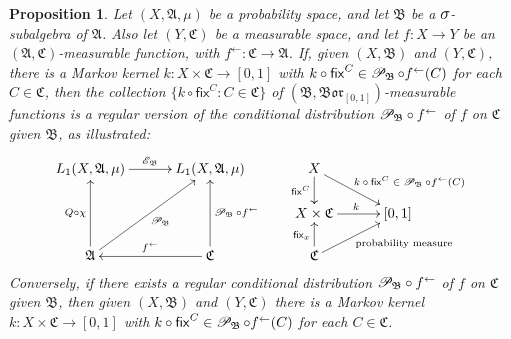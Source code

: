 \documentclass[
twoside=true,
paper=letter,
fontsize=11pt,
pagesize=auto,
leqno,
openany,
headsepline,
overfullrule,
]{scrbook}
\theoremstyle{plain}
\theoremstyle{plain}
\newtheorem{prop}[thm]{Proposition}
\theoremstyle{definition}
\theoremstyle{bfnoteitalic}
\theoremstyle{bfnoteroman}
\newcommand{\sigalg}[1]{\mathfrak{#1}}
\newcommand{\cali}[1]{\mathscr{#1}}
\newcommand{\sfop}[1]{\mathsf{#1}}
\newcommand{\condexpop}[1]{\mathop{\cali{E}\hspace{-1pt}}\nolimits_{#1}}
\newcommand{\condprobop}[1]{\mathop{\cali{P}\hspace{-1pt}}\nolimits_{#1}}
\newcommand{\borel}{\mathfrak{Bor}}
\newcommand{\textsigma}{\hbox{\large{$\sigma$}}\kern-1pt}
\newcommand{\preimage}[1]{#1^{\leftarrow}}
\newcommand{\sigmaalgebra}{\sigalg{A}}
\newcommand{\sigmaalgebraii}{\sigalg{B}}
\newcommand{\sigmaalgebraiii}{\sigalg{C}}
\newcommand{\Lone}{L_1(\measurespace, \sigmaalgebra, \measure)}
\newcommand{\function}{f}
\newcommand{\measurespace}{X}
\newcommand{\measurespaceii}{Y}
\newcommand{\mspaceelt}{x}
\newcommand{\measure}{\mu}
\newcommand{\setiii}{C}
\newcommand{\markovkernel}{k}
\newcommand{\fixinthefirst}[1]{\sfop{fix}_{#1}}
\newcommand{\fixinthesecond}[1]{\sfop{fix}^{#1}}
\begin{document}
\begin{prop}\label{equivalent_definition_regular_distribution}
Let $(\measurespace, \sigmaalgebra, \measure)$ be a probability space, and let $\sigmaalgebraii$ be a $\textsigma$-subalgebra of $\sigmaalgebra$. Also let $(\measurespaceii, \sigmaalgebraiii)$ be a measurable space, and let 
$\function:\measurespace\to\measurespaceii$ be an
$(\sigmaalgebra, \sigmaalgebraiii)$\hyp{}measurable function, with
$\preimage{\function} : \sigmaalgebraiii \to \sigmaalgebra$.
If, given $(\measurespace, \sigmaalgebraii)$ and $(\measurespaceii, \sigmaalgebraiii)$, 
there is a Markov kernel $\markovkernel:\measurespace\times\sigmaalgebraiii\to [0,1]$ with 
$\markovkernel\circ\fixinthesecond{\setiii} \in \condprobop{\sigmaalgebraii}\circ \preimage{\function}(\setiii)$ for each 
$\setiii\in\sigmaalgebraiii$, then the collection 
$\{ 
\markovkernel\circ\fixinthesecond{\setiii} 
: 
\setiii\in\sigmaalgebraiii
\}$
of $(\sigmaalgebraii,\borel_{[0,1]})$\hyp{}measurable functions
is a regular version of the conditional distribution ${\condprobop{\sigmaalgebraii}}\circ \preimage{\function}$ of 
$\function$ on $\sigmaalgebraiii$ given $\sigmaalgebraii$, as illustrated:
\[
\xymatrix@R=16pt@C=30pt{ 
\Lone \ar[r]^{\condexpop{\sigmaalgebraii}}
& \Lone 
& \measurespace 
\ar[d]_-{\fixinthesecond{\setiii}} 
\ar[dr]^{\qquad\text{$\markovkernel\circ\fixinthesecond{\setiii} \in \condprobop{\sigmaalgebraii}\circ \preimage{\function}(\setiii)$}}
\\
& 
& \measurespace\times\sigmaalgebraiii \ar[r]^{\markovkernel} 
& [0,1] 
\\
\sigmaalgebra \ar[uu]^{Q\circ\chi} \ar[uur]_{\condprobop{\sigmaalgebraii}} 
& \sigmaalgebraiii 
\ar[uu]_{\condprobop{\sigmaalgebraii}\circ \preimage{\function}} 
\ar[l]_{\preimage{\function}}
& \sigmaalgebraiii \ar[ur]_{\qquad\text{probability measure}} \ar[u]^{\fixinthefirst{\mspaceelt}} 
& 
\\
}
\]
Conversely, if there exists a regular conditional distribution  
${\condprobop{\sigmaalgebraii}}\circ \preimage{\function}$ 
of 
$\function$ on $\sigmaalgebraiii$ given $\sigmaalgebraii$, then
given $(\measurespace, \sigmaalgebraii)$ and $(\measurespaceii, \sigmaalgebraiii)$ 
there is a Markov kernel $k:\measurespace\times\sigmaalgebraiii\to [0,1]$ with 
$k\circ\fixinthesecond{\setiii} \in 
\condprobop{\sigmaalgebraii}\circ \preimage{\function}(\setiii)$ for each 
$\setiii\in\sigmaalgebraiii$.
\end{prop}
\end{document}

